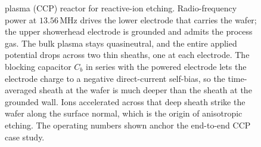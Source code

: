\begin{figure}[htbp]
{plasma (CCP) reactor for reactive-ion etching. Radio-frequency power at
$13.56\,\si{\mega\hertz}$ drives the lower electrode that carries the wafer;
the upper showerhead electrode is grounded and admits the process gas. The
bulk plasma stays quasineutral, and the entire applied potential drops
across two thin sheaths, one at each electrode. The blocking capacitor
$C_b$ in series with the powered electrode lets the electrode charge to a
negative direct-current self-bias, so the time-averaged sheath at the wafer
is much deeper than the sheath at the grounded wall. Ions accelerated across
that deep sheath strike the wafer along the surface normal, which is the
origin of anisotropic etching. The operating numbers shown anchor the
end-to-end CCP case study.}
\label{fig:vol04ch13:ccp-reactor}
\end{figure}
